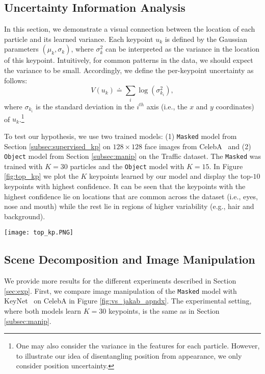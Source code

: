 \documentclass[nohyperref]{article}
\theoremstyle{plain}
\theoremstyle{definition}
\theoremstyle{remark}
\begin{document}
\subsection{Uncertainty Information Analysis}
\label{apndx:uncertainty}
In this section, we demonstrate a visual connection between the location of each particle and its learned variance.
Each keypoint $u_k$ is defined by the Gaussian parameters $(\mu_k, \sigma_k)$, where $\sigma_k^2$ can be interpreted as the variance in the location of this keypoint. Intuitively, for common patterns in the data, 
we should expect the variance to be small.
Accordingly, we define the per-keypoint uncertainty as follows: $$V(u_k) \doteq \sum_i \log(\sigma_{k_i}^2),$$ where $\sigma_{k_i}$ is the standard deviation in the $i^{th}$ axis (i.e., the $x$ and $y$ coordinates) of $u_k$.\footnote{One may also consider the variance in the features for each particle. However, to illustrate our idea of disentangling position from appearance, we only consider position uncertainty.}

To test our hypothesis, we use two trained models: (1) \texttt{Masked} model from Section \ref{subsec:supervised_kp} on $128\times 128$ face images from CelebA~\citep{liu2015faceattributes} and (2) \texttt{Object} model from Section \ref{subsec:manip} on the Traffic dataset. The \texttt{Masked} was trained with $K=30$ particles and the \texttt{Object} model with $K=15$. In Figure \ref{fig:top_kp} we plot the $K$ keypoints learned by our model and display the top-$10$ keypoints with highest confidence. It can be seen that the keypoints with the highest confidence lie on locations that are common across the dataset (i.e., eyes, nose and mouth) while the rest lie in regions of higher variability (e.g., hair and background).

\begin{figure*}[h]
     \centering
     \texttt{[image: top\_kp.PNG]}
        \caption{Information from uncertainty. We show the $K=30$ particles (second row) learned from two models and top-$10$ particles with the highest confidence (third row): (1) \texttt{Masked} model trained on CelebA (left); and (2) \texttt{Object} model trained on Traffic (right).}
        \label{fig:top_kp}
\end{figure*}

\subsection{Scene Decomposition and Image Manipulation}
\label{apndx:scene_manip_res}
We provide more results for the different experiments described in Section \ref{sec:exp}. First, we compare image manipulation of the \texttt{Masked} model with KeyNet~\citep{jakab2018unsupervised} on CelebA in Figure \ref{fig:vs_jakab_apndx}. The experimental setting, where both models learn $K=30$ keypoints, is the same as in Section \ref{subsec:manip}.
\end{document}
